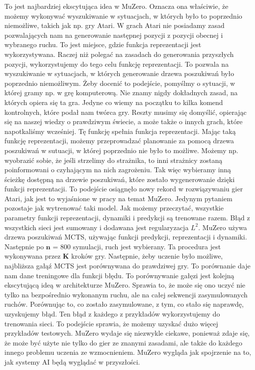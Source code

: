 To jest najbardziej ekscytująca idea w MuZero. Oznacza ona właściwie, że możemy wykonywać wyszukiwanie w sytuacjach, w których było to poprzednio niemożliwe, takich jak np. gry Atari. W grach Atari nie posiadamy zasad pozwalających nam na generowanie następnej pozycji z pozycji obecnej i wybranego ruchu. To jest miejsce, gdzie funkcja reprezentacji jest wykorzystywana. Raczej niż polegać na zasadach do generowania przyszłych pozycji, wykorzystujemy do tego celu funkcję reprezentacji. To pozwala na wyszukiwanie w sytuacjach, w których generowanie drzewa poszukiwań było poprzednio niemożliwym. Żeby docenić to podejście, pomyślmy o sytuacji, w której gramy np. w grę komputerową. Nie znamy nigdy dokładnych zasad, na których opiera się ta gra. Jedyne co wiemy na początku to kilka komend kontrolnych, które podał nam twórca gry. Reszty musimy się domyślić, opierając się na naszej wiedzy o prawdziwym świecie, a może także o innych grach, które napotkaliśmy wcześniej. Tę funkcję spełnia funkcja reprezentacji. Mając taką funkcję reprezentacji, możemy przeprowadzać planowanie za pomocą drzewa poszukiwań w sutuacji, w której poprzednio nie było to możliwe. Możemy np. wyobrazić sobie, że jeśli strzelimy do strażnika, to inni strażnicy zostaną poinformowani o czyhającym na nich zagrożeniu. Tak więc wybieramy inną ścieżkę dostępną na drzewie poszukiwań, które zostało wygenerowanie dzięki funkcji reprezentacji. To podejście osiągnęło nowy rekord w rozwiązywaniu gier Atari, jak jest to wyjaśnione w pracy na temat MuZero. Jedynym pytaniem pozostaje jak wytrenować taki model. Jak możemy przeczytać, wszystkie parametry funkcji reprezentacji, dynamiki i predykcji są trenowane razem. Błąd z wszystkich sieci jest sumowany i dodawana jest regularyzacja $L^2$. MuZero używa drzewa poszukiwań MCTS, używając funkcji predykcji, reprezentacji i dynamiki. Następnie po $\boldsymbol{n}$ = 800 symulacji, ruch jest wybierany. Ta procedura jest wykonywana przez \textbf{K} kroków gry. Następnie, żeby uczenie było możliwe, najbliższa gałąź MCTS jest porównywana do prawdziwej gry. To porównanie daje nam dane treningowe dla funkcji błędu. To porównywanie gałęzi jest kolejną ekscytującą ideą w architekturze MuZero. Sprawia to, że może się ono uczyć nie tylko na bezpośrednio wykonanym ruchu, ale na całej sekwencji zasymulowanych ruchów. Porównując to, co zostało zasymulowane, z tym, co stało się naprawdę, uzyskujemy błąd. Ten błąd z każdego z przykładów wykorzystujemy do trenowania sieci. To podejście sprawia, że możemy uzyskać dużo więcej przykładów testowych. MuZero wydaje się niezwykle ciekawe, ponieważ zdaje się, że może być użyte nie tylko do gier ze znanymi zasadami, ale także do każdego innego problemu uczenia ze wzmocnieniem. MuZero wygląda jak spojrzenie na to, jak systemy AI będą wyglądać w przyszłości.


